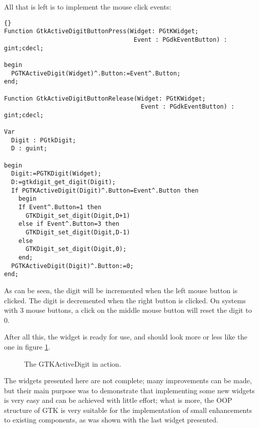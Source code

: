 \documentclass[10pt]{article}
\begin{document}
All that is left is to implement the mouse click events:
\begin{lstlisting}{}
Function GtkActiveDigitButtonPress(Widget: PGtKWidget; 
                                    Event : PGdkEventButton) : gint;cdecl;

begin
  PGTKActiveDigit(Widget)^.Button:=Event^.Button;
end;

Function GtkActiveDigitButtonRelease(Widget: PGtKWidget; 
                                      Event : PGdkEventButton) : gint;cdecl;

Var
  Digit : PGtkDigit;
  D : guint;

begin
  Digit:=PGTKDigit(Widget);
  D:=gtkdigit_get_digit(Digit);
  If PGTKActiveDigit(Digit)^.Button=Event^.Button then
    begin
    If Event^.Button=1 then
      GTKDigit_set_digit(Digit,D+1)
    else if Event^.Button=3 then
      GTKDigit_set_digit(Digit,D-1)
    else
      GTKDigit_set_digit(Digit,0);
    end;  
  PGTKActiveDigit(Digit)^.Button:=0;
end;
\end{lstlisting}
As can be seen, the digit will be incremented when the left mouse button
is clicked. The digit is decremented when the right button is clicked. 
On systems with 3 mouse buttons, a click on the middle mouse button will
reset the digit to 0.

After all this, the widget is ready for use, and should look more or less
like the one in figure \ref{fig:ex3}.

\begin{figure}[h]
\begin{center}
\caption{The GTKActiveDigit in action.}\label{fig:ex3}
\end{center}
\end{figure}

The widgets presented here are not complete; many improvements can be made,
but their main purpose was to demonstrate that implementing some new widgets
is very easy and can be achieved with little effort; what is more, the OOP
structure of GTK is very suitable for the implementation of small
enhancements to existing components, as was shown with the last widget
presented.
\end{document}
